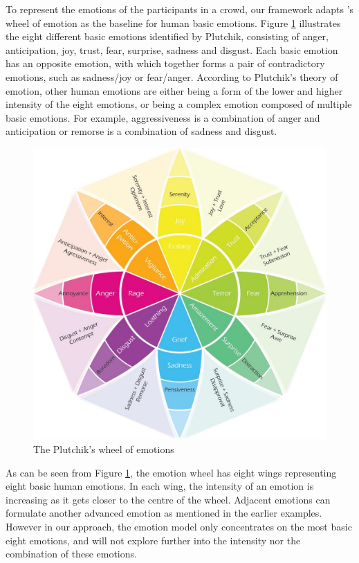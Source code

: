 To represent the emotions of the participants in a crowd, our framework adapts \citet{Plutchik1980}'s wheel of emotion as the baseline for human basic emotions. Figure \ref{fig:emotionModel} illustrates the eight different basic emotions identified by Plutchik, consisting of anger, anticipation, joy, trust, fear, surprise, sadness and disgust. Each basic emotion has an opposite emotion, with which together forms a pair of contradictory emotions, such as sadness/joy or fear/anger. According to Plutchik's theory of emotion, other human emotions are either being a form of the lower and higher intensity of the eight emotions, or being a complex emotion composed of multiple basic emotions. For example, aggressiveness is a combination of anger and anticipation or remorse is a combination of sadness and disgust.

\begin{figure}[htb!]
\centering    
\includegraphics[width=1.0\textwidth]{PlutchikModel}
\caption{The Plutchik's wheel of emotions}
\label{fig:emotionModel}
\end{figure}

As can be seen from Figure \ref{fig:emotionModel}, the emotion wheel has eight wings representing eight basic human emotions. In each wing, the intensity of an emotion is increasing as it gets closer to the centre of the wheel. Adjacent emotions can formulate another advanced emotion as mentioned in the earlier examples. However in our approach, the emotion model only concentrates on the most basic eight emotions, and will not explore further into the intensity nor the combination of these emotions.

